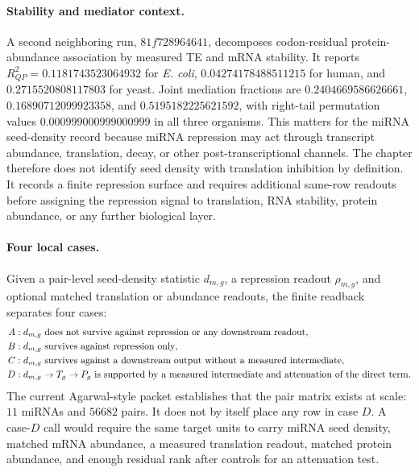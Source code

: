 \paragraph{Stability and mediator context.}
A second neighboring run, $81f728964641$, decomposes codon-residual protein-abundance association by measured TE and mRNA stability.  It reports $R^2_{QP}=0.1181743523064932$ for \emph{E. coli}, $0.04274178488511215$ for human, and $0.2715520808117803$ for yeast.  Joint mediation fractions are $0.2404669586626661$, $0.16890712099923358$, and $0.5195182225621592$, with right-tail permutation values $0.000999000999000999$ in all three organisms.  This matters for the miRNA seed-density record because miRNA repression may act through transcript abundance, translation, decay, or other post-transcriptional channels.  The chapter therefore does not identify seed density with translation inhibition by definition.  It records a finite repression surface and requires additional same-row readouts before assigning the repression signal to translation, RNA stability, protein abundance, or any further biological layer.

\paragraph{Four local cases.}
Given a pair-level seed-density statistic $d_{m,g}$, a repression readout $\rho_{m,g}$, and optional matched translation or abundance readouts, the finite readback separates four cases:
$$
\begin{aligned}
  A &: d_{m,g}\ \hbox{does not survive against repression or any downstream readout},\\
  B &: d_{m,g}\ \hbox{survives against repression only},\\
  C &: d_{m,g}\ \hbox{survives against a downstream output without a measured intermediate},\\
  D &: d_{m,g}\to T_g\to P_g\ \hbox{is supported by a measured intermediate and attenuation of the direct term}.
\end{aligned}
$$
The current Agarwal-style packet establishes that the pair matrix exists at scale: $11$ miRNAs and $56682$ pairs.  It does not by itself place any row in case $D$.  A case-$D$ call would require the same target units to carry miRNA seed density, matched mRNA abundance, a measured translation readout, matched protein abundance, and enough residual rank after controls for an attenuation test.

